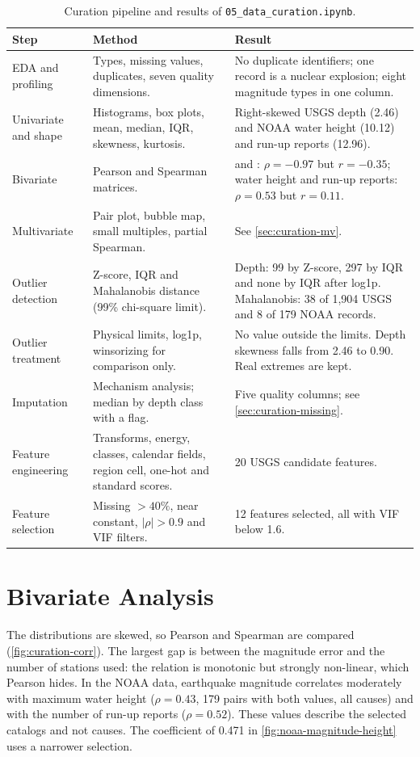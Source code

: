 \documentclass[a4paper,11pt,oneside]{book}
\begin{document}
\begin{table}[!htbp]
\centering
\small
\begin{tabularx}{\textwidth}{@{}L{2.9cm}YY@{}}
\toprule
Step & Method & Result \\
\midrule
EDA and profiling & Types, missing values, duplicates, seven quality dimensions. & No duplicate identifiers; one record is a nuclear explosion; eight magnitude types in one column. \\
Univariate and shape & Histograms, box plots, mean, median, IQR, skewness, kurtosis. & Right-skewed USGS depth (2.46) and NOAA water height (10.12) and run-up reports (12.96). \\
Bivariate & Pearson and Spearman matrices. &  and : $\rho=-0.97$ but $r=-0.35$; water height and run-up reports: $\rho=0.53$ but $r=0.11$. \\
Multivariate & Pair plot, bubble map, small multiples, partial Spearman. & See \cref{sec:curation-mv}. \\
Outlier detection & Z-score, IQR and Mahalanobis distance (99\% chi-square limit). & Depth: 99 by Z-score, 297 by IQR and none by IQR after log1p. Mahalanobis: 38 of 1,904 USGS and 8 of 179 NOAA records. \\
Outlier treatment & Physical limits, log1p, winsorizing for comparison only. & No value outside the limits. Depth skewness falls from 2.46 to 0.90. Real extremes are kept. \\
Imputation & Mechanism analysis; median by depth class with a flag. & Five quality columns; see \cref{sec:curation-missing}. \\
Feature engineering & Transforms, energy, classes, calendar fields, region cell, one-hot and standard scores. & 20 USGS candidate features. \\
Feature selection & Missing $>40\%$, near constant, $|\rho|>0.9$ and VIF filters. & 12 features selected, all with VIF below 1.6. \\
\bottomrule
\end{tabularx}
\caption{Curation pipeline and results of \texttt{05\_data\_curation.ipynb}.}
\label{tab:curation}
\end{table}

\section{Bivariate Analysis}
The distributions are skewed, so Pearson and Spearman are compared (\cref{fig:curation-corr}). The largest gap is between the magnitude error and the number of stations used: the relation is monotonic but strongly non-linear, which Pearson hides. In the NOAA data, earthquake magnitude correlates moderately with maximum water height ($\rho=0.43$, 179 pairs with both values, all causes) and with the number of run-up reports ($\rho=0.52$). These values describe the selected catalogs and not causes. The coefficient of 0.471 in \cref{fig:noaa-magnitude-height} uses a narrower selection.
\end{document}
